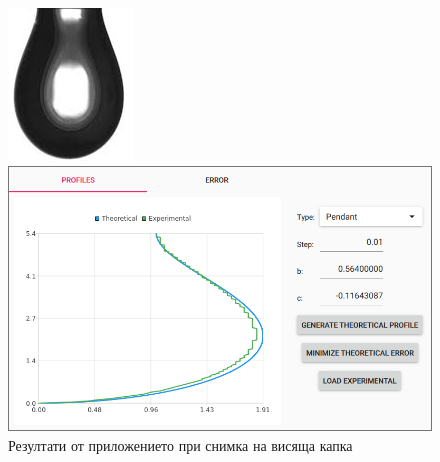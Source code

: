 \documentclass{article}
\begin{document}
\begin{figure}[H]
\centering
\begin{minipage}{0.5\textwidth}
  \centering
  \includegraphics[width=0.45\linewidth]{pendant_drop_4.png}
\end{minipage}%
\begin{minipage}{0.5\textwidth}
  \centering
  \includegraphics[width=0.9\linewidth]{app_pendant_4.png}
\end{minipage}
\caption{Резултати от приложението при снимка на висяща капка}
\end{figure}
\end{document}
